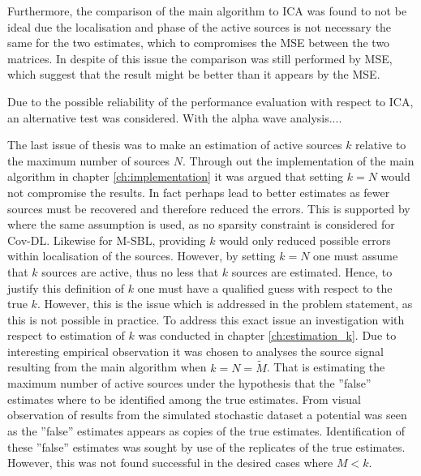Furthermore, the comparison of the main algorithm to ICA was found to not be ideal due the localisation and phase of the active sources is not necessary the same for the two estimates, which to compromises the MSE between the two matrices.
In despite of this issue the comparison was still performed by MSE, which suggest that the result might be better than it appears by the MSE. 

Due to the possible reliability of the performance evaluation with respect to ICA, an alternative test was considered. 
With the alpha wave analysis.... 

The last issue of thesis was to make an estimation of active sources $k$ relative to the maximum number of sources $N$. Through out the implementation of the main algorithm in chapter \ref{ch:implementation} it was argued that setting $k = N$ would not compromise the results. 
In fact perhaps lead to better estimates as fewer sources must be recovered and therefore reduced the errors.
This is supported by \cite{cov} where the same assumption is used, as no sparsity constraint is considered for Cov-DL. 
Likewise for M-SBL, providing $k$ would only reduced possible errors within localisation of the sources.
However, by setting $k = N$ one must assume that $k$ sources are active, thus no less that $k$ sources are estimated. 
Hence, to justify this definition of $k$ one must have a qualified guess with respect to the true $k$. 
However, this is the issue which is addressed in the problem statement, as this is not possible in practice. 
To address this exact issue an investigation with respect to estimation of $k$ was conducted in chapter \ref{ch:estimation_k}. 
Due to interesting empirical observation it was chosen to analyses the source signal resulting from the main algorithm when $k = N = \widetilde{M}$. 
That is estimating the maximum number of active sources under the hypothesis that the ''false'' estimates where to be identified among the true estimates. 
From visual observation of results from the simulated stochastic dataset a potential was seen as the ''false'' estimates appears as copies of the true estimates. 
Identification of these ''false'' estimates was sought by use of the replicates of the true estimates.
However, this was not found successful in the desired cases where $M<k$. 
